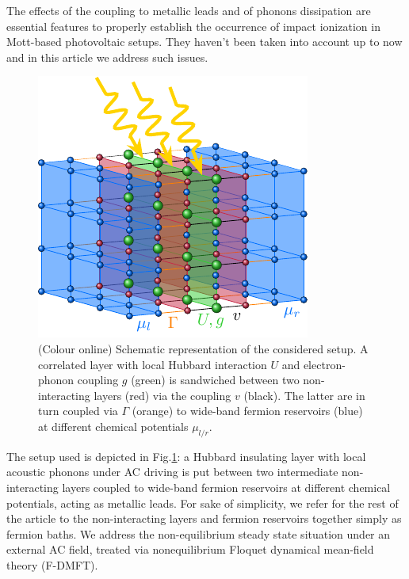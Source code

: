\documentclass[aps,prb,groupedaddress,showpacs,twocolumn,superscriptaddress,10pt]{revtex4-2}
\begin{document}
The effects of the coupling to metallic leads and of phonons dissipation are essential features to properly establish the occurrence of impact ionization in Mott-based photovoltaic setups. They haven't been taken into account up to now and in this article we address such issues.

 
 
\begin{figure}[ht]
\includegraphics[width=0.9\linewidth]{./figures_Paper1/setup.pdf}
\caption{(Colour online) Schematic representation of the considered setup. A correlated layer with local Hubbard interaction $U$ and electron-phonon coupling $g$ (green) is sandwiched between two non-interacting layers (red) via the coupling $v$ (black). The latter are in turn coupled via $\Gamma$ (orange) to wide-band fermion reservoirs (blue) at different chemical potentials $\mu_{l/r}$.}
\label{fig:setup}
\end{figure}   
 
The setup used is depicted in Fig.\ref{fig:setup}: a Hubbard insulating layer with local acoustic phonons under AC driving is put between two intermediate non-interacting layers coupled to wide-band fermion reservoirs at different chemical potentials, acting as metallic leads. For sake of simplicity, we refer for the rest of the article to the non-interacting layers and fermion reservoirs together simply as fermion baths. We address the non-equilibrium steady state situation under an external AC field, treated via nonequilibrium Floquet dynamical mean-field theory (F-DMFT). 
\end{document}
